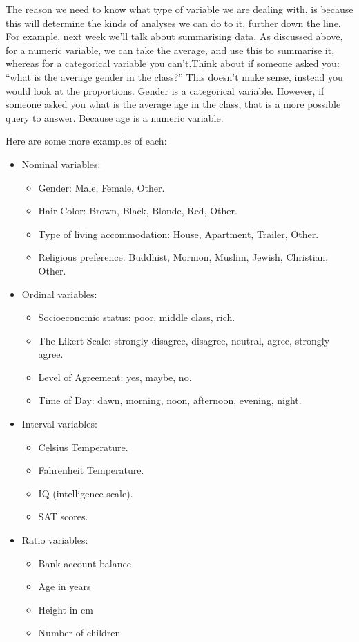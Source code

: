 \documentclass[]{book}
\providecommand{\tightlist}{%
  \setlength{\itemsep}{0pt}\setlength{\parskip}{0pt}}
\theoremstyle{definition}
\theoremstyle{definition}
\theoremstyle{definition}
\theoremstyle{remark}
\begin{document}
The reason we need to know what type of variable we are dealing with, is
because this will determine the kinds of analyses we can do to it,
further down the line. For example, next week we'll talk about
summarising data. As discussed above, for a numeric variable, we can
take the average, and use this to summarise it, whereas for a
categorical variable you can't.Think about if someone asked you: ``what
is the average gender in the class?'' This doesn't make sense, instead
you would look at the proportions. Gender is a categorical variable.
However, if someone asked you what is the average age in the class, that
is a more possible query to answer. Because age is a numeric variable.

Here are some more examples of each:

\begin{itemize}
\tightlist
\item
  Nominal variables:

  \begin{itemize}
  \tightlist
  \item
    Gender: Male, Female, Other.
  \item
    Hair Color: Brown, Black, Blonde, Red, Other.
  \item
    Type of living accommodation: House, Apartment, Trailer, Other.
  \item
    Religious preference: Buddhist, Mormon, Muslim, Jewish, Christian,
    Other.
  \end{itemize}
\item
  Ordinal variables:

  \begin{itemize}
  \tightlist
  \item
    Socioeconomic status: poor, middle class, rich.
  \item
    The Likert Scale: strongly disagree, disagree, neutral, agree,
    strongly agree.
  \item
    Level of Agreement: yes, maybe, no.
  \item
    Time of Day: dawn, morning, noon, afternoon, evening, night.
  \end{itemize}
\item
  Interval variables:

  \begin{itemize}
  \tightlist
  \item
    Celsius Temperature.
  \item
    Fahrenheit Temperature.
  \item
    IQ (intelligence scale).
  \item
    SAT scores.
  \end{itemize}
\item
  Ratio variables:

  \begin{itemize}
  \tightlist
  \item
    Bank account balance
  \item
    Age in years
  \item
    Height in cm
  \item
    Number of children
  \end{itemize}
\end{itemize}
\end{document}
